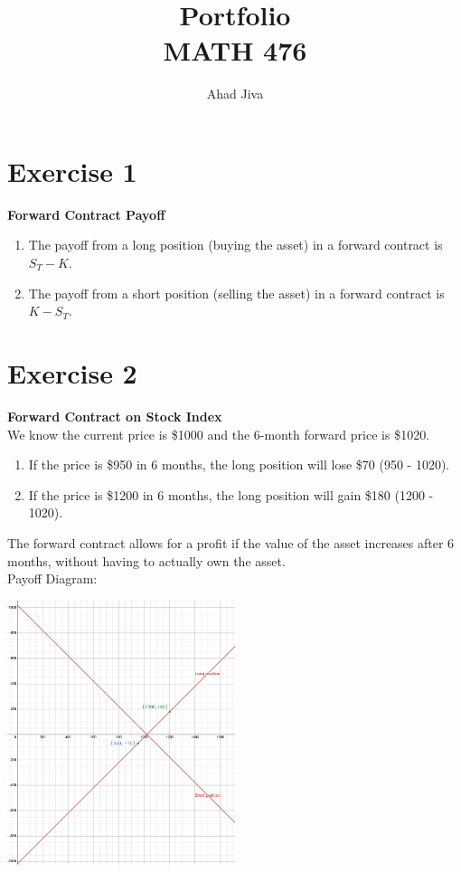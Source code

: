 \documentclass{article}
\title{Portfolio \\ \large MATH 476}
\author{Ahad Jiva}
\begin{document}
\maketitle
\section*{Exercise 1} 
\begin{flushleft}
    \textbf{Forward Contract Payoff}
    \begin{enumerate}
        \item The payoff from a long position (buying the asset) in a forward contract is $S_T - K$.
        \item The payoff from a short position (selling the asset) in a forward contract is $K - S_T$.
    \end{enumerate}
\end{flushleft}
\section*{Exercise 2}
\begin{flushleft}
    \textbf{Forward Contract on Stock Index} \\
    We know the current price is \$1000 and the 6-month forward price is \$1020.
    \begin{enumerate}
        \item If the price is \$950 in 6 months, the long position will lose \$70 (950 - 1020).
        \item If the price is \$1200 in 6 months, the long position will gain \$180 (1200 - 1020).        
    \end{enumerate}
    The forward contract allows for a profit if the value of the asset increases after 6 months, without having to actually own the asset.
    \\ Payoff Diagram:
    \begin{center}
        \includegraphics[width=0.5\textwidth]{figures/ex2.png}
    \end{center}
\end{flushleft}
\end{document}
